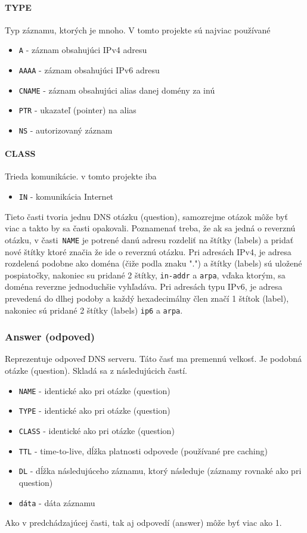 \documentclass[titlepage]{article}
\begin{document}
\paragraph{TYPE}
Typ záznamu, ktorých je mnoho. V tomto projekte sú najviac používané
\begin{itemize}
    \item \verb|A| - záznam obsahujúci IPv4 adresu
    \item \verb|AAAA| - záznam obsahujúci IPv6 adresu
    \item \verb|CNAME| - záznam obsahujúci alias danej domény za inú 
    \item \verb|PTR| - ukazateľ (pointer) na alias
    \item \verb|NS| - autorizovaný záznam
\end{itemize}

\paragraph{CLASS}
Trieda komunikácie. v tomto projekte iba
\begin{itemize}
   \item \verb|IN| - komunikácia Internet
\end{itemize}
Tieto časti tvoria jednu DNS otázku (question), samozrejme otázok môže byť viac
a takto by sa časti opakovali.
Poznamenať treba, že ak sa jedná o reverznú otázku, v časti \verb|NAME| je potrené
danú adresu rozdeliť na štítky (labels) a pridať nové štítky ktoré značia že ide o reverznú
otázku. Pri adresách IPv4, je adresa rozdelená podobne ako doména (čiže podla znaku ".") a štítky 
(labels) sú uložené pospiatočky, nakoniec su pridané 2 štítky, \verb|in-addr| a \verb|arpa|, vďaka ktorým,
sa doména reverzne jednoduchšie vyhľadáva. Pri adresách typu IPv6, je adresa prevedená do dlhej podoby a
každý hexadecimálny člen značí 1 štítok (label), nakoniec sú pridané 2 štítky (labels) \verb|ip6| a \verb|arpa|.

\subsubsection{Answer (odpoved)}
Reprezentuje odpoveď DNS serveru.
Táto časť ma premennú velkosť. Je podobná otázke (question).
Skladá sa z následujúcich častí.

\begin{itemize}
    \item \verb|NAME| - identické ako pri otázke (question)
    \item \verb|TYPE| - identické ako pri otázke (question)
    \item \verb|CLASS| - identické ako pri otázke (question)
    \item \verb|TTL| - time-to-live, dĺžka platnosti odpovede (používané pre caching)
    \item \verb|DL| - dĺžka následujúceho záznamu, ktorý následuje (záznamy rovnaké ako pri question)
    \item \verb|dáta| - dáta záznamu
\end{itemize}
Ako v predchádzajúcej časti, tak aj odpovedí (answer) môže byť viac ako 1. 
\end{document}
